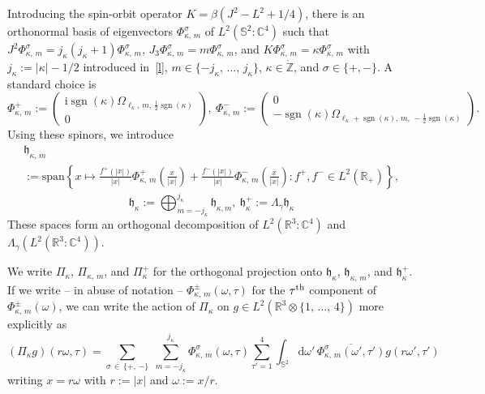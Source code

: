 \documentclass[AHL,Unicode,longabstracts,published]{cedram}
\DeclareMathOperator{\sgn}{sgn}
\newcommand{\spanl}{\mathrm{span}}
\newcommand*\rd{\mathrm{d}}
\newcommand*\ri{\mathrm{i}}
\newcommand{\bbS}{\mathbb{S}}
\newcommand*\cz{\mathbb{C}}
\newcommand*\gz{\mathbb{Z}}
\newcommand*\rz{\mathbb{R}}
\newcommand*\zp{\dot{\gz}}
\newcommand*\gh{\mathfrak{h}}
\newcommand*\ghpk{{\gh^+_\kappa}}
\begin{document}
Introducing the spin-orbit operator $K=\beta(J^2-L^2+1/4)$, there is an orthonormal basis of eigenvectors $\Phi^\sigma_{\kappa,\,m}$ of $L^2(\bbS^2:\cz^4)$ such that $J^2\Phi^\sigma_{\kappa,\,m}=j_\kappa(j_\kappa+1)\Phi^\sigma_{\kappa,\,m}$, $J_3\Phi^\sigma_{\kappa,\,m}=m\Phi^\sigma_{\kappa,\,m}$, and $K\Phi^\sigma_{\kappa,\,m}=\kappa\Phi^\sigma_{\kappa,\,m}$ with $j_\kappa:=|\kappa|-1/2$ introduced in~\eqref{l}, $m\in\{-j_\kappa,\,\dots,\,j_\kappa\}$, $\kappa\in\zp$, and $\sigma\in\{+,-\}$. A standard choice is
\begin{equation}\label{fi}
\Phi^+_{\kappa,\,m} := \left(
\begin{matrix}
\ri\sgn(\kappa)\Omega_{\ell_\kappa,\,m,\,\frac12\sgn(\kappa)}\\
0
\end{matrix}
\right), \
\Phi^-_{\kappa,\,m}:=\left(
\begin{matrix}
0\\
-\sgn(\kappa)\Omega_{\ell_\kappa+\sgn(\kappa),\,m,\,-\frac12\sgn(\kappa)}
\end{matrix}
\right).
\end{equation}
Using these spinors, we introduce
\begin{multline}\label{a3}
\gh_{\kappa,\,m}\\
 :=\spanl\left\{x\mapsto \frac{f^+(|x|)}{|x|} \Phi_{\kappa,\,m}^+\left(\frac x{|x|}\right) + \frac{f^-(|x|)}{|x|}\Phi_{\kappa,\,m}^-\left(\frac x{|x|}\right):f^+,f^-\in L^2\left(\rz_+\right)\right\},
\end{multline}
\begin{equation}\label{a2}
\gh_\kappa:= \bigoplus_{m=-j_\kappa}^{j_\kappa}\gh_{\kappa,m},\ \gh_\kappa^+:=\Lambda_\gamma\gh_\kappa
\end{equation}
These spaces form an orthogonal decomposition of $L^2(\rz^3:\cz^4)$ and $\Lambda_\gamma(L^2(\rz^3:\cz^4))$.

We write $\Pi_\kappa$, $\Pi_{\kappa,\,m}$, and $\Pi_\kappa^+$ for the orthogonal projection onto $\gh_{\kappa}$, $\gh_{\kappa,\,m}$, and $\ghpk$. If we write -- in abuse of notation -- $\Phi_{\kappa,\,m}^\pm(\omega,\tau)$ for the $\tau^{\rm th}$ component of $\Phi_{\kappa,\,m}^\pm(\omega)$, we can write the action of $\Pi_\kappa$ on $g\in L^2(\rz^3\otimes\{1,\,\dots,\,4\})$ more explicitly as
\begin{equation}\label{a1}
\left(\Pi_\kappa g\right)\left(r\omega,\tau\right) = \sum_{\sigma\,\in\,\{+,\,-\}}\;\sum_{m=-j_\kappa}^{j_\kappa} \Phi^\sigma_{\kappa,\,m}\left(\omega,\tau\right)
\sum_{\tau'=1}^4\int_{\bbS^2}\rd \omega'\, \overline{ \Phi^\sigma_{\kappa,\,m}\left(\omega',\tau'\right)}g\left(r\omega',\tau'\right)
\end{equation}
writing $x=r\omega$ with $r:=|x|$ and $\omega:=x/r$.
\end{document}
